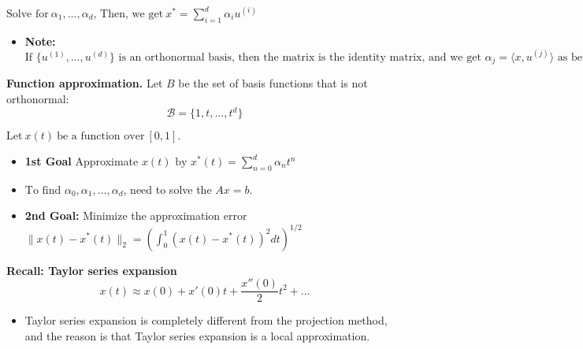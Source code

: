 \begin{derivation}
        $\text{Solve for} \ \alpha_1, \dots, \alpha_d$, $\text{Then, we get} \ x^* = \sum_{i=1}^{d} \alpha_i u^{(i)}$
        \begin{itemize}
            \item \textbf{Note:} $\text{If } \{u^{(1)}, \dots, u^{(d)}\} \text{ is an orthonormal basis, then the matrix is the identity matrix, and we get } \alpha_j = \langle x, u^{(j)} \rangle \text{ as before.}$
        \end{itemize}
    \end{derivation}

    \begin{example}
        \textbf{Function approximation.}
        Let $B$ be the set of basis functions that is not orthonormal:
        \[
        \mathcal{B} = \{1, t, \dots, t^d\}
        \]

        $\text{Let} \ x(t) \ \text{be a function over} \ [0, 1].$
        \begin{itemize}
            \item \textbf{1st Goal} Approximate $x(t) \text{ by } x^*(t) = \sum_{n=0}^{d} \alpha_n t^n$
            \item $\text{To find } \alpha_0, \alpha_1, \dots, \alpha_d$, need to solve the $Ax=b$.
            \item \textbf{2nd Goal:} Minimize the approximation error $\|x(t) - x^*(t)\|_2 = \left( \int_0^1 (x(t) - x^*(t))^2 dt \right)^{1/2}$
        \end{itemize}

        \textbf{Recall: Taylor series expansion}
        \[
        x(t) \approx x(0) + x'(0) t + \frac{x''(0)}{2} t^2 + \dots
        \]

        \begin{itemize}
            \item Taylor series expansion is completely different from the projection method, and the reason is that Taylor series expansion is a local approximation.
        \end{itemize}

    \end{example}


